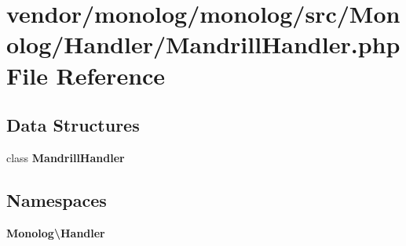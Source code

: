 \section{vendor/monolog/monolog/src/\+Monolog/\+Handler/\+Mandrill\+Handler.php File Reference}
\label{_mandrill_handler_8php}
\subsection*{Data Structures}
\begin{DoxyCompactItemize}
\item 
class {\bf Mandrill\+Handler}
\end{DoxyCompactItemize}
\subsection*{Namespaces}
\begin{DoxyCompactItemize}
\item 
 {\bf Monolog\textbackslash{}\+Handler}
\end{DoxyCompactItemize}
